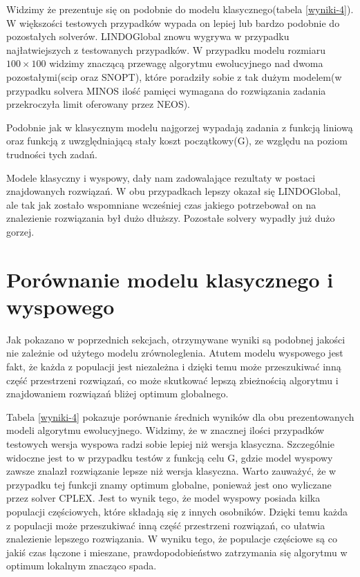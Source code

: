 Widzimy że prezentuje się on podobnie do modelu klasycznego(tabela \ref{wyniki-4}). W większości testowych przypadków wypada on lepiej lub bardzo 
podobnie do pozostałych solverów. LINDOGlobal znowu wygrywa w przypadku najłatwiejszych z testowanych przypadków. W przypadku modelu rozmiaru 
$100 \times 100$ widzimy znaczącą przewagę algorytmu ewolucyjnego nad dwoma pozostałymi(scip oraz SNOPT), które poradziły sobie z tak dużym 
modelem(w przypadku solvera MINOS ilość pamięci wymagana do rozwiązania zadania przekroczyła limit oferowany przez NEOS).

Podobnie jak w klasycznym modelu najgorzej wypadają zadania z funkcją liniową oraz funkcją z uwzględniającą stały koszt początkowy(G), ze względu 
na poziom trudności tych zadań. 

Modele klasyczny i wyspowy, dały nam zadowalające rezultaty w postaci znajdowanych rozwiązań. W obu przypadkach lepszy okazał się LINDOGlobal, ale tak 
jak zostało wspomniane wcześniej czas jakiego potrzebował on na znalezienie rozwiązania był dużo dłuższy. Pozostałe solvery wypadły już dużo gorzej.

\section{Porównanie modelu klasycznego i wyspowego}

Jak pokazano w poprzednich sekcjach, otrzymywane wyniki są podobnej jakości nie zależnie od użytego modelu zrównoleglenia. Atutem modelu wyspowego 
jest fakt, że każda z populacji jest niezależna i dzięki temu może przeszukiwać inną część przestrzeni rozwiązań\cite{ISLAND-MODEL-PERFORMANCE}, 
co może skutkować lepszą zbieżnością algorytmu i znajdowaniem rozwiązań bliżej optimum globalnego.


Tabela \ref{wyniki-4} pokazuje porównanie średnich wyników dla obu prezentowanych modeli algorytmu ewolucyjnego. Widzimy, że w znacznej ilości 
przypadków testowych wersja wyspowa radzi sobie lepiej niż wersja klasyczna. Szczególnie widoczne jest to w przypadku testów z funkcją celu G, 
gdzie model wyspowy zawsze znalazł rozwiązanie lepsze niż wersja klasyczna. Warto zauważyć, że w przypadku tej funkcji znamy optimum globalne, 
ponieważ jest ono wyliczane przez solver CPLEX. Jest to wynik tego, że model wyspowy posiada kilka populacji częściowych, które składają się 
z innych osobników. Dzięki temu każda z populacji może przeszukiwać inną część przestrzeni rozwiązań, co ułatwia znalezienie lepszego rozwiązania. 
W wyniku tego, że populacje częściowe są co jakiś czas łączone i mieszane, prawdopodobieństwo zatrzymania się algorytmu w optimum lokalnym 
znacząco spada. 

